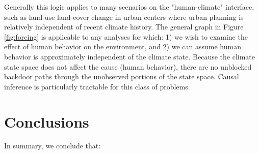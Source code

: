 \documentclass[12pt]{article}
\begin{document}
Generally this logic applies to many scenarios on the "human-climate"
interface, such as land-use land-cover change in urban centers where
urban planning is relatively independent of recent climate
history. The general graph in Figure \ref{fig:forcing} is applicable
to any analyses for which: 1) we wish to examine the effect of human
behavior on the environment, and 2) we can assume human behavior is
approximately independent of the climate state. Because the climate
state space does not affect the cause (human behavior), there are no
unblocked backdoor paths through the unobserved portions of the state
space. Causal inference is particularly tractable for this class of
problems.

\section{Conclusions}

In summary, we conclude that:
\end{document}
